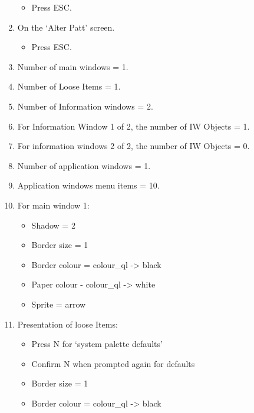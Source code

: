 \begin{enumerate}
{\begin{itemize}[itemsep=0pt]
\item{}Press ESC.

\end{itemize}
}
\item{On the `Alter Patt' screen.
\begin{itemize}[itemsep=0pt]

\item{}Press ESC.

\end{itemize}
}
\item{Number of main windows = 1.
}
\item{Number of Loose Items = 1.
}
\item{Number of Information windows = 2.
}
\item{For Information Window 1 of 2, the number of IW Objects =
        1.
}
\item{For information windows 2 of 2, the number of IW Objects =
        0.
}
\item{Number of application windows = 1.
}
\item{Application windows menu items = 10.
}
\item{For main window 1:
\begin{itemize}[itemsep=0pt]

\item{}Shadow = 2


\item{}Border size = 1


\item{}Border colour = colour\_ql -{}>{} black


\item{}Paper colour -{} colour\_ql -{}>{} white


\item{}Sprite = arrow

\end{itemize}
}
\item{Presentation of loose Items:
\begin{itemize}[itemsep=0pt]

\item{}Press N for `system palette defaults'


\item{}Confirm N when prompted again for defaults


\item{}Border size = 1


\item{}Border colour = colour\_ql -{}>{} black



\end{itemize}}
\end{enumerate}
